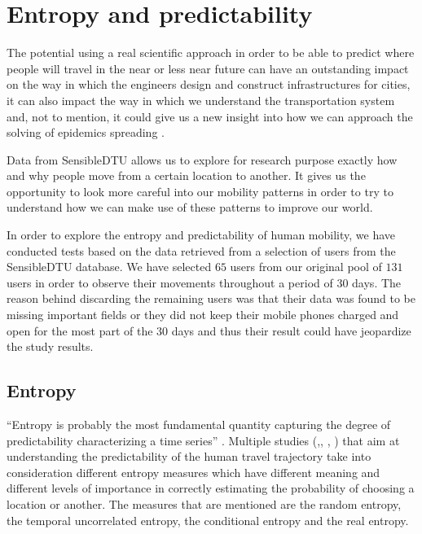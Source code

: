 \chapter{Entropy and predictability}

The potential using a real scientific approach in order to be able to predict
where people will travel in the near or less near future can have an outstanding
impact on the way in which the engineers design and construct infrastructures
for cities, it can also impact the way in which we understand the transportation
system and, not to mention, it could give us a new insight into how we can
approach the solving of epidemics spreading \cite{Lu13} \cite{Brockmann08}.

Data from SensibleDTU \cite{Stopczynski14m} allows us to explore for research
purpose exactly how and why people move from a certain location to another. It
gives us the opportunity to look more careful into our mobility patterns in
order to try to understand how we can make use of these patterns to improve our
world.

In order to explore the entropy and predictability of human mobility, we have
conducted tests based on the data retrieved from a selection of users from the
SensibleDTU database. We have selected $65$ users from our original pool of
$131$ users in order to observe their movements throughout a period of $30$ days. The
reason behind discarding the remaining users was that their data was found to be
missing important fields or they did not keep their mobile phones charged and
open for the most part of the $30$ days and thus their result could have
jeopardize the study results.

\section{Entropy}

``Entropy is probably the most fundamental quantity capturing the degree of
predictability characterizing a time series'' \cite{Barabasi10}. Multiple
studies (\cite{Sinatra14},\cite{Lu13}, \cite{marin2012exploring},
\cite{Barabasi10}) that aim at understanding the predictability of the human
travel trajectory take into consideration different entropy measures which have
different meaning and different levels of importance in correctly estimating the
probability of choosing a location or another. The measures that are mentioned
are the random entropy, the temporal uncorrelated entropy, the conditional
entropy and the real entropy.

